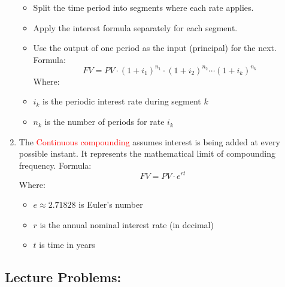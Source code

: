 \documentclass[
]{book}
\providecommand{\tightlist}{%
  \setlength{\itemsep}{0pt}\setlength{\parskip}{0pt}}
\begin{document}
\begin{enumerate}
  \begin{itemize}
  \tightlist
  \item
    Split the time period into segments where each rate applies.
  \item
    Apply the interest formula separately for each segment.
  \item
    Use the output of one period as the input (principal) for the next.
    Formula:
    \[
    FV = PV \cdot (1 + i_1)^{n_1} \cdot (1 + i_2)^{n_2} \cdots (1 + i_k)^{n_k}
    \]
    Where:
  \item
    \(i_k\) is the periodic interest rate during segment \(k\)
  \item
    \(n_k\) is the number of periods for rate \(i_k\)
  \end{itemize}
\item
  The \textcolor{red}{Continuous compounding} assumes interest is being added at every possible instant. It represents the mathematical limit of compounding frequency.
  Formula:
  \[
  FV = PV \cdot e^{rt}
  \]
  Where:

  \begin{itemize}
  \tightlist
  \item
    \(e \approx 2.71828\) is Euler's number
  \item
    \(r\) is the annual nominal interest rate (in decimal)
  \item
    \(t\) is time in years
  \end{itemize}
\end{enumerate}

\subsection*{Lecture Problems:}\label{lecture-problems-11}
\end{document}
